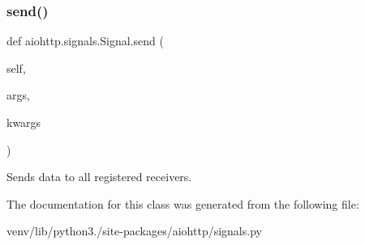 \subsubsection{\texorpdfstring{send()}{send()}}
{\footnotesize\ttfamily def aiohttp.\+signals.\+Signal.\+send (\begin{DoxyParamCaption}\item[{}]{self,  }\item[{}]{args,  }\item[{}]{kwargs }\end{DoxyParamCaption})}

\begin{DoxyVerb}Sends data to all registered receivers.
\end{DoxyVerb}
 

The documentation for this class was generated from the following file\+:\begin{DoxyCompactItemize}
\item 
venv/lib/python3./site-\/packages/aiohttp/signals.\+py\end{DoxyCompactItemize}
